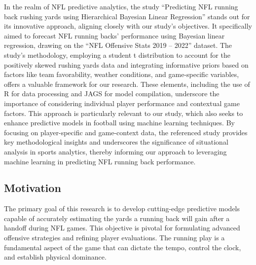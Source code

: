 \documentclass[
  super,
  preprint,
  3p]{elsarticle}
\begin{document}
In the realm of NFL predictive analytics, the study ``Predicting NFL
running back rushing yards using Hierarchical Bayesian Linear
Regression'' stands out for its innovative approach, aligning closely
with our study's objectives. It specifically aimed to forecast NFL
running backs' performance using Bayesian linear regression, drawing on
the ``NFL Offensive Stats 2019 -- 2022'' dataset. The study's
methodology, employing a student t distribution to account for the
positively skewed rushing yards data and integrating informative priors
based on factors like team favorability, weather conditions, and
game-specific variables, offers a valuable framework for our research.
These elements, including the use of R for data processing and JAGS for
model compilation, underscore the importance of considering individual
player performance and contextual game factors. This approach is
particularly relevant to our study, which also seeks to enhance
predictive models in football using machine learning techniques. By
focusing on player-specific and game-context data, the referenced study
provides key methodological insights and underscores the significance of
situational analysis in sports analytics, thereby informing our approach
to leveraging machine learning in predicting NFL running back
performance.

\hypertarget{motivation}{%
\subsection{Motivation}\label{motivation}}

The primary goal of this research is to develop cutting-edge predictive
models capable of accurately estimating the yards a running back will
gain after a handoff during NFL games. This objective is pivotal for
formulating advanced offensive strategies and refining player
evaluations. The running play is a fundamental aspect of the game that
can dictate the tempo, control the clock, and establish physical
dominance.
\end{document}
